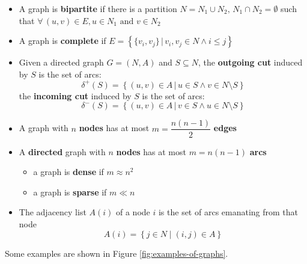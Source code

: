 \documentclass[english]{article}
\begin{document}
\begin{itemize}
\begin{itemize}
        \end{itemize}
  \item A graph is \textbf{bipartite} if there is a partition \(N = N_1 \cup N_2, \, N_1 \cap N_2 = \emptyset\) such that \(\forall \, (u, v) \in E, u \in N_1 \text{ and } v \in N_2\)
  \item A graph is \textbf{complete} if \(E = \left\{\{v_i, v_j\} \,|\, v_i, v_j \in N \land i \leq j \right\}\)
  \item Given a directed graph \(G = (N, A)\) and \(S \subseteq N\), the \textbf{outgoing cut} induced by \(S\) is the set of arcs:
        \[\delta^+(S) = \left\{ (u, v) \in A \,|\, u \in S \land v \in N \setminus S \right\}\]
        the \textbf{incoming cut} induced by \(S\) is the set of arcs:
        \[\delta^-(S) = \left\{ (u, v) \in A \,|\, v \in S \land u \in N \setminus S \right\}\]
  \item A graph with \(n\) \textbf{nodes} has at most \(m = \dfrac{n(n-1)}{2}\) \textbf{edges}
  \item A \textbf{directed} graph with \(n\) \textbf{nodes} has at most \(m = n(n-1)\) \textbf{arcs}
        \begin{itemize}
          \item a graph is \textbf{dense} if \(m \approx n^2\)
          \item a graph is \textbf{sparse} if \(m \ll n\)
        \end{itemize}
  \item The adjacency list \(A(i)\) of a node \(i\) is the set of arcs emanating from that node
        \[ A(i) = \left\{ j \in N \mid   (i, j) \in A  \right\} \]
\end{itemize}

\bigskip
Some examples are shown in Figure \ref{fig:examples-of-graphs}.
\end{document}
